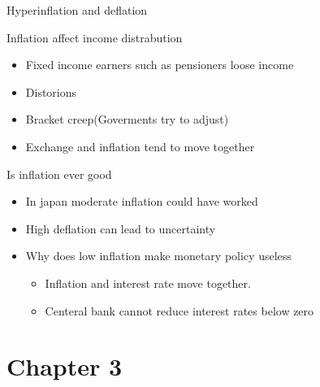 \documentclass[]{article}
\providecommand{\tightlist}{%
  \setlength{\itemsep}{0pt}\setlength{\parskip}{0pt}}
\begin{document}
Hyperinflation and deflation

Inflation affect income distrabution

\begin{itemize}
\tightlist
\item
  Fixed income earners such as pensioners loose income
\item
  Distorions
\item
  Bracket creep(Goverments try to adjust)
\item
  Exchange and inflation tend to move together
\end{itemize}

Is inflation ever good

\begin{itemize}
\tightlist
\item
  In japan moderate inflation could have worked
\item
  High deflation can lead to uncertainty
\item
  Why does low inflation make monetary policy useless

  \begin{itemize}
  \tightlist
  \item
    Inflation and interest rate move together.
  \item
    Centeral bank cannot reduce interest rates below zero
  \end{itemize}
\end{itemize}

\hypertarget{chapter-3}{%
\section{Chapter 3}\label{chapter-3}}
\end{document}
